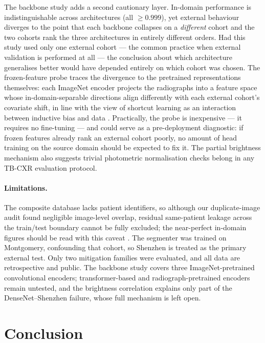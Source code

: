 \documentclass{article}
\begin{document}
The backbone study adds a second cautionary layer. In-domain performance is indistinguishable
across architectures (all $\geq 0.999$), yet external behaviour diverges to the point that each
backbone collapses on a \emph{different} cohort and the two cohorts rank the three architectures in
entirely different orders. Had this study used only one external cohort --- the common practice
when external validation is performed at all --- the conclusion about which architecture
generalises better would have depended entirely on which cohort was chosen. The frozen-feature
probe traces the divergence to the pretrained representations themselves: each ImageNet encoder
projects the radiographs into a feature space whose in-domain-separable directions align
differently with each external cohort's covariate shift, in line with the view of shortcut learning
as an interaction between inductive bias and data \citep{geirhos2020shortcut}. Practically, the
probe is inexpensive --- it requires no fine-tuning --- and could serve as a pre-deployment
diagnostic: if frozen features already rank an external cohort poorly, no amount of head training
on the source domain should be expected to fix it. The partial brightness mechanism also suggests
trivial photometric normalisation checks belong in any TB-CXR evaluation protocol.

\paragraph{Limitations.}
The composite database lacks patient identifiers, so although our duplicate-image audit found
negligible image-level overlap, residual same-patient leakage across the train/test boundary cannot
be fully excluded; the near-perfect in-domain figures should be read with this caveat
\citep{rouzrokh2022mitigating, tampu2022inflation}. The segmenter was trained on Montgomery,
confounding that cohort, so Shenzhen is treated as the primary external test. Only two mitigation
families were evaluated, and all data are retrospective and public. The backbone study covers three
ImageNet-pretrained convolutional encoders; transformer-based and radiograph-pretrained encoders
remain untested, and the brightness correlation explains only part of the DenseNet--Shenzhen
failure, whose full mechanism is left open.

\section{Conclusion}
\end{document}
